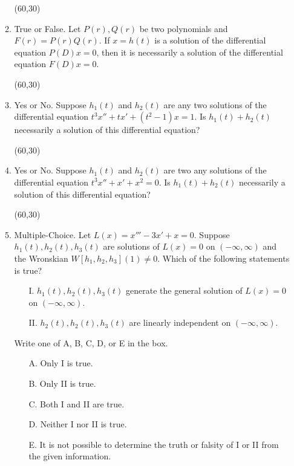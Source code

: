 \documentclass[12pt]{article}
\begin{document}
\begin{enumerate}
\begin{enumerate}
              \hfill \framebox(60,30){}

            \item True or False.  Let $P(r), Q(r)$ be two polynomials
              and $F(r) = P(r) Q(r)$.   If $x= h(t)$ is a solution of
              the differential equation $P(D)x=0$, then it is necessarily a
              solution of the differential equation $F(D) x = 0$.

              \hfill \framebox(60,30){}

              \item Yes or No.  Suppose $h_1(t)$ and $h_2(t)$ are any two
            solutions of the differential equation $t^3 x'' + tx' +
            (t^2-1)x = 1$.  Is $h_1(t) + h_2(t)$ necessarily a solution of
            this differential equation?

            \hfill \framebox(60,30){}

            \item Yes or No.  Suppose $h_1(t)$ and $h_2(t)$ are two any
            solutions of the differential equation $t^3 x'' + x' +
            x^2 = 0$.  Is $h_1(t) + h_2(t)$  necessarily a solution of
            this differential equation?

            \hfill \framebox(60,30){}


              \item Multiple-Choice.  Let $L(x) = x''' - 3x' +x =0$.  Suppose $h_1(t),
                h_2(t), h_3(t)$ are solutions of $L(x)=0$ on $(-\infty,
                \infty)$ and the
                Wronskian $W[h_1, h_2, h_3](1) \ne 0$.
                Which of the following statements is true?
                \smallskip
                \begin{enumerate}
                  \item[I.] $h_1(t), h_2(t), h_3(t)$ generate the
                    general solution of $L(x)=0$ on $(-\infty,\infty)$.
                    \item[II.] $h_2(t), h_2(t), h_3(t)$ are linearly
                      independent on $(-\infty,\infty)$.
                    \end{enumerate}

                    \medskip
                    Write one of A, B, C, D, or E in the box.

                    \medskip

                    \begin{enumerate}
                  \item[A.]  Only I is true.
                  \item[B.] Only II is true.
                  \item[C.] Both I and II are true.
                  \item[D.] Neither I nor II is true.
                    \item[E.] It is not possible to determine the
                      truth or falsity of I or II from the given information.
                  \end{enumerate}
                  


\end{enumerate}
\end{enumerate}
\end{document}
